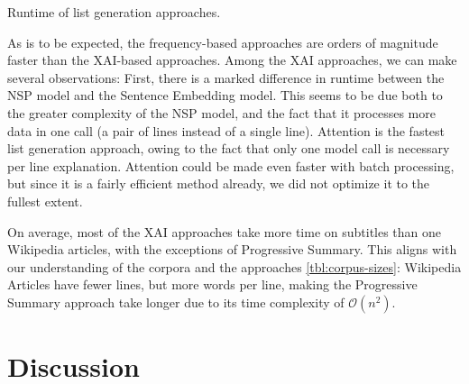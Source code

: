 \begin{table}[ht]
	\centering
	
	\caption{Runtime of list generation approaches.}
	\label{tbl:runtime-results}
\end{table}

As is to be expected, the frequency-based approaches are orders of magnitude faster than the XAI-based approaches.
Among the XAI approaches, we can make several observations:
First, there is a marked difference in runtime between the NSP model and the Sentence Embedding model.
This seems to be due both to the greater complexity of the NSP model, and the fact that it processes more data in one call (a pair of lines instead of a single line).
Attention is the fastest list generation approach, owing to the fact that only one model call is necessary per line explanation.
Attention could be made even faster with batch processing, but since it is a fairly efficient method already, we did not optimize it to the fullest extent.

On average, most of the XAI approaches take more time on subtitles than one Wikipedia articles, with the exceptions of Progressive Summary.
This aligns with our understanding of the corpora and the approaches \ref{tbl:corpus-sizes}:
Wikipedia Articles have fewer lines, but more words per line, making the Progressive Summary approach take longer due to its time complexity of $\mathcal{O}(n^2)$.


\section{Discussion}


